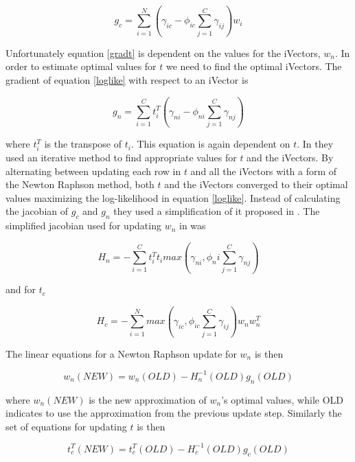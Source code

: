 \begin{equation}\label{gradt}
g_c=\sum_{i=1}^N(\gamma_{ic}-\phi_{ic}\sum_{j=1}^{C}\gamma_{ij})w_i
\end{equation}

Unfortunately equation \ref{gradt} is dependent on the values for the iVectors, $w_n$. In order to estimate optimal values for $t$ we need to find the optimal iVectors. The gradient of equation \ref{loglike} with respect to an iVector is

\begin{equation}\label{gradw}
g_n=\sum_{i=1}^Ct_i^T(\gamma_{ni}-\phi_{ni}\sum_{j=1}^C \gamma_{nj})
\end{equation}

where $t_i^T$ is the transpose of $t_i$. This equation is again dependent on $t$. In \cite{sviVector} they used an iterative method to find appropriate values for $t$ and the iVectors. By alternating between updating each row in $t$ and all the iVectors with a form of the Newton Raphson method, both $t$ and the iVectors converged to their optimal values maximizing the log-likelihood in equation \ref{loglike}. Instead of calculating the jacobian of $g_c$ and $g_n$ they used a simplification of it proposed in \cite{jacobian}. The simplified jacobian used for updating $w_n$ in \cite{sviVector} was

\begin{equation}\label{jacobianw}
H_n = -\sum_{i=1}^Ct_i^Tt_imax(\gamma_{ni}, \phi_ni\sum_{j=1}^C\gamma_{nj})
\end{equation}

and for $t_c$

\begin{equation}\label{jacobiant}
H_c= -\sum_{i=1}^{N}max(\gamma_{ic}, \phi_{ic}\sum_{j=1}^C\gamma_{ij})w_nw_n^T
\end{equation}

The linear equations for a Newton Raphson update for $w_n$ is then

\begin{equation}\label{newtonw}
w_n(NEW)=w_n(OLD)-H_n^{-1}(OLD)g_n(OLD)
\end{equation}

where $w_n(NEW)$ is the new approximation of $w_n$'s optimal values, while OLD indicates to use the approximation from the previous update step. Similarly the set of equations for updating $t$ is then

\begin{equation}\label{newtont}
t_c^T(NEW)=t_c^T(OLD)-H_c^{-1}(OLD)g_c(OLD)
\end{equation}

